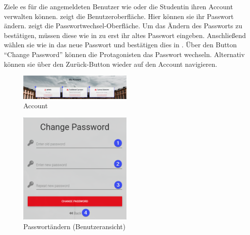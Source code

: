 Ziele es für die angemeldeten Benutzer wie \dutzi oder die Studentin \ariane ihren Account verwalten können. 
\abb {} zeigt die Benutzeroberfläche. \newline
Hier können sie ihr Passwort ändern. 
\abb {} zeigt die Passwortwechsel-Oberfläche. 
Um das Ändern des Passworts zu bestätigen, müssen diese wie in \desOne zu erst ihr altes Passwort eingeben. 
Anschließend wählen sie wie in \desTwo das neue Passwort und bestätigen dies in \desThree. 
Über den Button \enquote{Change Password} können die Protagonisten das Passwort wechseln. 
Alternativ können sie über den Zurück-Button \desFour wieder auf den Account navigieren. 
% 
\begin{figure}[H]
	\centering
	\includegraphics[width=0.5\textwidth, keepaspectratio]{img/guide/MyAccount.png}
	\captionsetup{justification=centering, format=plain}
	\caption[Account]{Account\\\quelleScreenshot}
	\label{fig:MyAccount}
\end{figure}
% 
\begin{figure}[H]
	\centering
	\includegraphics[width=0.5\textwidth, keepaspectratio]{img/guide/ChangeOwnPassword.png}
	\captionsetup{justification=centering, format=plain}
	\caption[Passwortändern (Benutzeransicht)]{Passwortändern (Benutzeransicht)\\\quelleScreenshot}
	\label{fig:ChangeOwnPassword}
\end{figure}
% 
